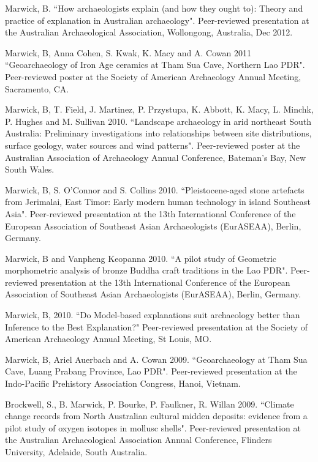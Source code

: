 {\ind Marwick, B. ``How archaeologists explain (and how they ought to): Theory and practice of explanation in Australian archaeology". Peer-reviewed presentation at the Australian Archaeological Association, Wollongong, Australia, Dec 2012.

\ind Marwick, B, Anna Cohen, S. Kwak, K. Macy and A. Cowan 2011 ``Geoarchaeology of Iron Age ceramics at Tham Sua Cave, Northern Lao PDR". Peer-reviewed poster at the Society of American Archaeology Annual Meeting, Sacramento, CA.

\ind Marwick, B, T. Field, J. Martinez, P. Przystupa, K. Abbott, K. Macy, L. Minchk, P. Hughes and M. Sullivan 2010. ``Landscape archaeology in arid northeast South Australia: Preliminary investigations into relationships between site distributions, surface geology, water sources and wind patterns". Peer-reviewed poster at the Australian Association of Archaeology Annual Conference, Bateman’s Bay, New South Wales.

\ind Marwick, B, S. O’Connor and S. Collins 2010. ``Pleistocene-aged stone artefacts from Jerimalai, East Timor: Early modern human technology in island Southeast Asia". Peer-reviewed presentation at the 13th International Conference of the European Association of Southeast Asian Archaeologists (EurASEAA), Berlin, Germany.

\ind Marwick, B and Vanpheng Keopanna 2010. ``A pilot study of Geometric morphometric analysis of bronze Buddha craft traditions in the Lao PDR". Peer-reviewed presentation  at the 13th International Conference of the European Association of Southeast Asian Archaeologists (EurASEAA), Berlin, Germany.

\ind Marwick, B, 2010. ``Do Model-based explanations suit archaeology better than Inference to the Best Explanation?" Peer-reviewed presentation at the Society of American Archaeology Annual Meeting, St Louis, MO.

\ind Marwick, B, Ariel Auerbach and A. Cowan 2009. ``Geoarchaeology at Tham Sua Cave, Luang Prabang Province, Lao PDR". Peer-reviewed presentation at the Indo-Pacific Prehistory Association Congress, Hanoi, Vietnam.

\ind Brockwell, S., B. Marwick, P. Bourke, P. Faulkner, R. Willan 2009. ``Climate change records from North Australian cultural midden deposits: evidence from a pilot study of oxygen isotopes in mollusc shells". Peer-reviewed presentation  at the Australian Archaeological Association Annual Conference, Flinders University, Adelaide, South Australia.

}
